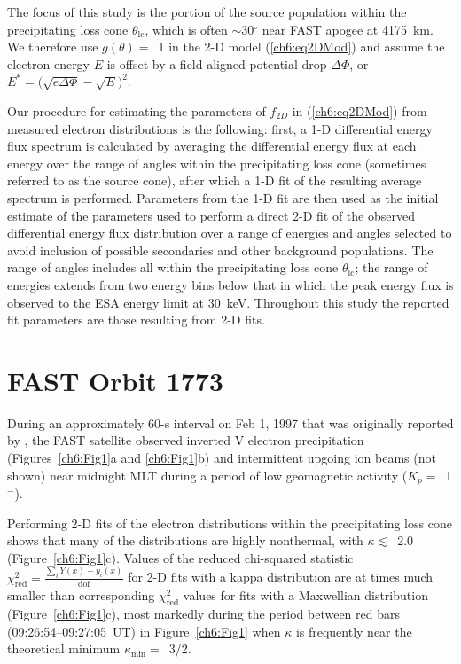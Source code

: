
  The focus of this study is the portion of the source population within the
  precipitating loss cone $\theta_{\textrm{lc}}$, which is often
  $\sim$30$^\circ$ near FAST apogee at 4175~km. We therefore use $g(\theta) =$~1
  in the 2-D model (\ref{ch6:eq2DMod}) and assume the electron energy $E$ is
  offset by a field-aligned potential drop $\Delta \Phi$, or $E^* = \big(
  \sqrt{e \Delta \Phi} - \sqrt{E} \big)^2$.

  Our procedure for estimating the parameters of $f_{2D}$ in (\ref{ch6:eq2DMod})
  from measured electron distributions is the following: first, a 1-D
  differential energy flux spectrum is calculated by averaging the differential
  energy flux at each energy over the range of angles within the precipitating
  loss cone (sometimes referred to as the source cone), after which a 1-D fit of
  the resulting average spectrum is performed. Parameters from the 1-D fit are
  then used as the initial estimate of the parameters used to perform a direct
  2-D fit of the observed differential energy flux distribution over a range of
  energies and angles selected to avoid inclusion of possible secondaries and
  other background populations. The range of angles includes all within the
  precipitating loss cone $\theta_{\textrm{lc}}$; the range of energies extends
  from two energy bins below that in which the peak energy flux is observed to
  the ESA energy limit at 30~keV. Throughout this study the reported fit
  parameters are those resulting from 2-D fits.

  \section{FAST Orbit 1773}

  During an approximately 60-s interval on Feb 1, 1997 that was originally
  reported by \citet{Elphic1998}, the FAST satellite observed inverted V
  electron precipitation (Figures~\ref{ch6:Fig1}a and \ref{ch6:Fig1}b) and
  intermittent upgoing ion beams (not shown) near midnight MLT during a period
  of low geomagnetic activity ($K_p =$~1$^-$).

  Performing 2-D fits of the electron distributions within the precipitating
  loss cone shows that many of the distributions are highly nonthermal, with
  $\kappa \lesssim$~2.0 (Figure~\ref{ch6:Fig1}c). Values of the reduced
  chi-squared statistic $\chi^2_{\mathrm{red}} = \frac{\sum_i Y(x) -
    y_i(x)}{\mathrm{dof}}$ for 2-D fits with a kappa distribution are at times
  much smaller than corresponding $\chi^2_{\textrm{red}}$ values for fits with a
  Maxwellian distribution (Figure~\ref{ch6:Fig1}c), most markedly during the
  period between red bars (09:26:54--09:27:05~UT) in Figure~\ref{ch6:Fig1} when
  $\kappa$ is frequently near the theoretical minimum $\kappa_{\mathrm{min}}
  =$~3/2.

